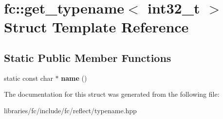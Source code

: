 \hypertarget{structfc_1_1get__typename_3_01int32__t_01_4}{}\section{fc\+:\+:get\+\_\+typename$<$ int32\+\_\+t $>$ Struct Template Reference}
\label{structfc_1_1get__typename_3_01int32__t_01_4}
\subsection*{Static Public Member Functions}
\begin{DoxyCompactItemize}
\item 
\mbox{\label{structfc_1_1get__typename_3_01int32__t_01_4_ae4da4fd91f587733aa9afccbe0d6da51}} 
static const char $\ast$ {\bfseries name} ()
\end{DoxyCompactItemize}


The documentation for this struct was generated from the following file\+:\begin{DoxyCompactItemize}
\item 
libraries/fc/include/fc/reflect/typename.\+hpp\end{DoxyCompactItemize}

